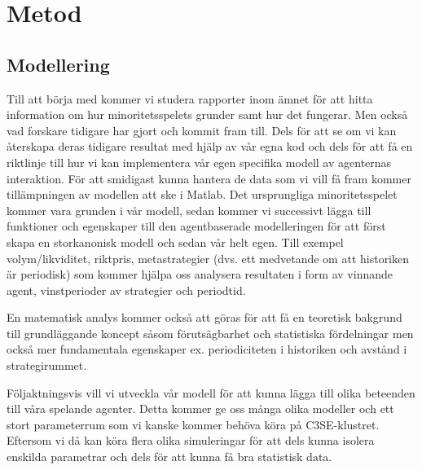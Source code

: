 \section{Metod}


\subsection{Modellering}
Till att börja med kommer vi studera rapporter inom ämnet för att hitta information om hur minoritetsspelets grunder samt hur det fungerar. Men också vad forskare tidigare har gjort och kommit fram till. Dels för att se om vi kan återskapa deras tidigare resultat med hjälp av vår egna kod och dels för att få en riktlinje till hur vi kan implementera vår egen specifika modell av agenternas interaktion. För att smidigast kunna hantera de data som vi vill få fram kommer tillämpningen av modellen att ske i Matlab. Det ursprungliga minoritetsspelet kommer vara grunden i vår modell, sedan kommer vi successivt lägga till funktioner och egenskaper till den agentbaserade modelleringen för att först skapa en storkanonisk modell och sedan vår helt egen. Till exempel volym/likviditet, riktpris, metastrategier (dvs. ett medvetande om att historiken är periodisk) som kommer hjälpa oss analysera resultaten i form av vinnande agent, vinstperioder av strategier och periodtid.

En matematisk analys kommer också att göras för att få en teoretisk bakgrund till grundläggande koncept såsom förutsägbarhet och statistiska fördelningar men också mer fundamentala egenskaper ex. periodiciteten i historiken och avstånd i strategirummet. 

Följaktningsvis vill vi utveckla vår modell för att kunna lägga till olika beteenden till våra spelande agenter. Detta kommer ge oss många olika modeller och ett stort parameterrum som vi kanske kommer behöva köra på C3SE-klustret. Eftersom vi då kan köra flera %
olika simuleringar för att dels kunna isolera enskilda parametrar och dels för att kunna få bra statistisk data.

